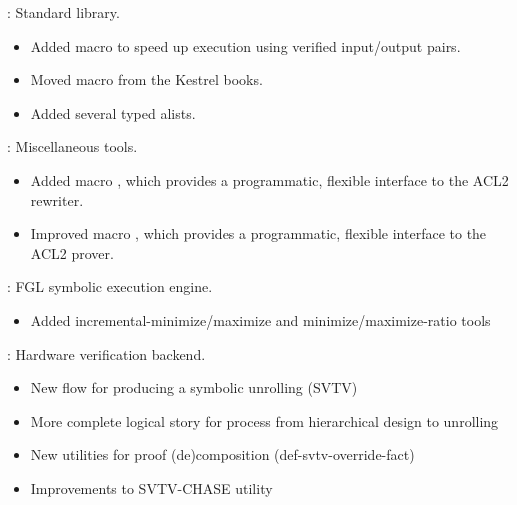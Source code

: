 
\begin{frame}

\implibtitle

:
Standard library.
\begin{itemize}
\item Added macro  to speed up execution
      using verified input/output pairs.
\item Moved macro  from the Kestrel books.
\item Added several typed alists.
\end{itemize}

\end{frame}


\begin{frame}

\implibtitle

: Miscellaneous tools.
\begin{itemize}
\item Added macro ,
      which provides a programmatic, flexible interface
      to the ACL2 rewriter.
\item Improved macro ,
      which provides a programmatic, flexible interface
      to the ACL2 prover.
\end{itemize}
\end{frame}


\begin{frame}

\implibtitle

: FGL symbolic execution engine.
\begin{itemize}
\item Added incremental-minimize/maximize and minimize/maximize-ratio tools
\end{itemize}
\end{frame}


\begin{frame}

\implibtitle

: Hardware verification backend.
\begin{itemize}
\item New flow for producing a symbolic unrolling (SVTV)
\item More complete logical story for process from hierarchical design to unrolling
\item New utilities for proof (de)composition (def-svtv-override-fact)
\item Improvements to SVTV-CHASE utility
\end{itemize}
\end{frame}

